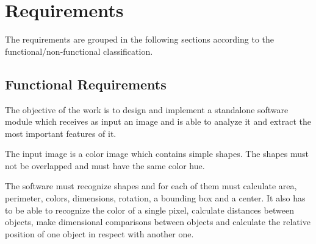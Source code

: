 	\section{Requirements}
	The requirements are grouped in the following sections according to the functional/non-functional classification. 

		\subsection{Functional Requirements}
		The objective of the work is to design and implement a standalone software module which receives as input an image and is able to analyze it and extract the most important features of it.

		The input image is a color image which contains simple shapes. The shapes must not be overlapped and must have the same color hue.

		The software must recognize shapes and for each of them must calculate area, perimeter, colors, dimensions, rotation, a bounding box and a center. It also has to be able to recognize the color of a single pixel, calculate distances between objects, make dimensional comparisons between objects and calculate the relative position of one object in respect with another one.

